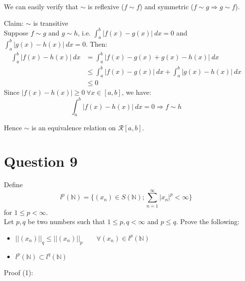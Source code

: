 \documentclass{article}
\begin{document}
	We can easily verify that $\sim$ is reflexive ($f \sim f$) and symmetric ($f \sim g
	\Rightarrow g \sim f$).

	Claim: $\sim$ is transitive \\
	Suppose $f \sim g$ and $g \sim h$, i.e. $\int_{a}^{b} |f(x) - g(x)| ~ dx = 0$ and
	$\int_{a}^{b} |g(x) - h(x)| ~ dx = 0$.
	Then:
	\begin{align*}
		\int_{a}^{b} |f(x) - h(x)| ~ dx &= \int_{a}^{b} |f(x) - g(x) + g(x) - h(x)| ~ dx \\
		&\le \int_{a}^{b} |f(x) - g(x)| ~ dx + \int_{a}^{b} |g(x) - h(x)| ~ dx \\
		&\le 0
	\end{align*}
	Since $|f(x) - h(x)| \ge 0 ~ \forall x \in [a, b]$, we have:
	\[ \int_{a}^{b} |f(x) - h(x)| ~ dx = 0 \Rightarrow f \sim h \]

	Hence $\sim$ is an equivalence relation on $\mathcal{R}[a, b]$.

\section{Question 9}

	Define
	\[ l^p(\mathbb{N}) = \{(x_n) \in S(\mathbb{N}); \sum_{n = 1}^{\infty} |x_n|^p < \infty\} \]
	for $1 \le p < \infty$. \\
	Let $p, q$ be two numbers such that $1 \le p, q < \infty$ and $p \le q$.
	Prove the following:

	\begin{itemize}
		\item $||(x_n)||_q \le ||(x_n)||_p \quad \quad \forall (x_n) \in l^p(\mathbb{N})$
		\item $l^p(\mathbb{N}) \subset l^q(\mathbb{N})$
	\end{itemize}

	Proof (1):
\end{document}
